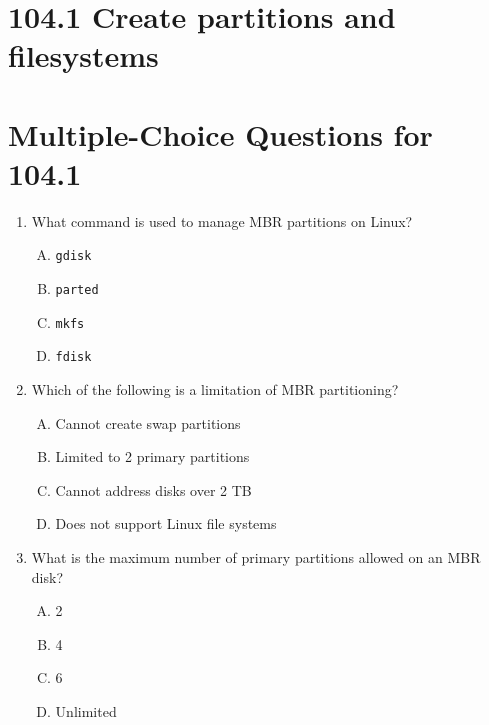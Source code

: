 \documentclass[a4paper]{report}
\begin{document}
\newpage
\section*{104.1 Create partitions and filesystems}

\newpage
\section*{Multiple-Choice Questions for 104.1}
\begin{enumerate}[1.]

    \item What command is used to manage MBR partitions on Linux?  
    \begin{enumerate}[A)]
        \item \texttt{gdisk}  
        \item \texttt{parted}  
        \item \texttt{mkfs}  
        \item \texttt{fdisk}  
    \end{enumerate}

    \item Which of the following is a limitation of MBR partitioning?  
    \begin{enumerate}[A)]
        \item Cannot create swap partitions  
        \item Limited to 2 primary partitions  
        \item Cannot address disks over 2 TB  
        \item Does not support Linux file systems  
    \end{enumerate}

    \item What is the maximum number of primary partitions allowed on an MBR disk?  
    \begin{enumerate}[A)]
        \item 2  
        \item 4  
        \item 6  
        \item Unlimited  
    \end{enumerate}


\end{enumerate}
\end{document}
